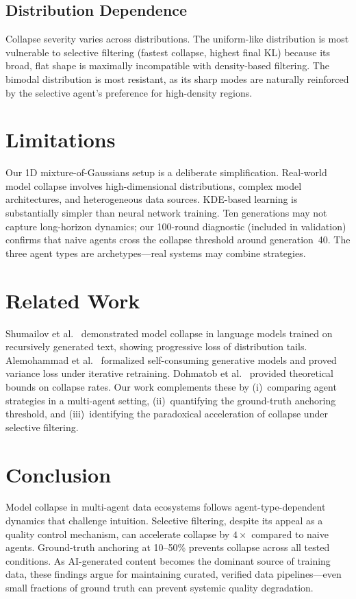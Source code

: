 \documentclass[11pt]{article}
\begin{document}
\subsection{Distribution Dependence}

Collapse severity varies across distributions.
The uniform-like distribution is most vulnerable to selective filtering (fastest collapse, highest final KL) because its broad, flat shape is maximally incompatible with density-based filtering.
The bimodal distribution is most resistant, as its sharp modes are naturally reinforced by the selective agent's preference for high-density regions.

\section{Limitations}

Our 1D mixture-of-Gaussians setup is a deliberate simplification.
Real-world model collapse involves high-dimensional distributions, complex model architectures, and heterogeneous data sources.
KDE-based learning is substantially simpler than neural network training.
Ten generations may not capture long-horizon dynamics; our 100-round diagnostic (included in validation) confirms that naive agents cross the collapse threshold around generation~40.
The three agent types are archetypes---real systems may combine strategies.

\section{Related Work}

Shumailov et al.~\cite{shumailov2024collapse} demonstrated model collapse in language models trained on recursively generated text, showing progressive loss of distribution tails.
Alemohammad et al.~\cite{alemohammad2023self} formalized self-consuming generative models and proved variance loss under iterative retraining.
Dohmatob et al.~\cite{dohmatob2024tale} provided theoretical bounds on collapse rates.
Our work complements these by (i)~comparing agent strategies in a multi-agent setting, (ii)~quantifying the ground-truth anchoring threshold, and (iii)~identifying the paradoxical acceleration of collapse under selective filtering.

\section{Conclusion}

Model collapse in multi-agent data ecosystems follows agent-type-dependent dynamics that challenge intuition.
Selective filtering, despite its appeal as a quality control mechanism, can accelerate collapse by $4\times$ compared to naive agents.
Ground-truth anchoring at 10--50\% prevents collapse across all tested conditions.
As AI-generated content becomes the dominant source of training data, these findings argue for maintaining curated, verified data pipelines---even small fractions of ground truth can prevent systemic quality degradation.
\end{document}
